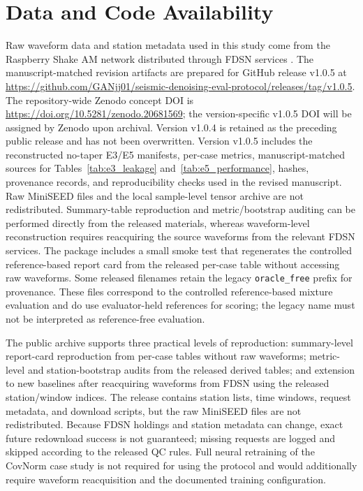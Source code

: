 \documentclass[review,12pt,authoryear]{elsarticle}
\begin{document}
\section*{Data and Code Availability}
Raw waveform data and station metadata used in this study come from the Raspberry Shake AM network distributed through FDSN services \citep{raspberryshake2016}. The manuscript-matched revision artifacts are prepared for GitHub release v1.0.5 at \url{https://github.com/GANjj01/seismic-denoising-eval-protocol/releases/tag/v1.0.5}. The repository-wide Zenodo concept DOI is \url{https://doi.org/10.5281/zenodo.20681569}; the version-specific v1.0.5 DOI will be assigned by Zenodo upon archival. Version v1.0.4 is retained as the preceding public release and has not been overwritten. Version v1.0.5 includes the reconstructed no-taper E3/E5 manifests, per-case metrics, manuscript-matched sources for Tables~\ref{tab:e3_leakage} and~\ref{tab:e5_performance}, hashes, provenance records, and reproducibility checks used in the revised manuscript. Raw MiniSEED files and the local sample-level tensor archive are not redistributed. Summary-table reproduction and metric/bootstrap auditing can be performed directly from the released materials, whereas waveform-level reconstruction requires reacquiring the source waveforms from the relevant FDSN services. The package includes a small smoke test that regenerates the controlled reference-based report card from the released per-case table without accessing raw waveforms. Some released filenames retain the legacy \texttt{oracle\_free} prefix for provenance. These files correspond to the controlled reference-based mixture evaluation and do use evaluator-held references for scoring; the legacy name must not be interpreted as reference-free evaluation.

The public archive supports three practical levels of reproduction: summary-level report-card reproduction from per-case tables without raw waveforms; metric-level and station-bootstrap audits from the released derived tables; and extension to new baselines after reacquiring waveforms from FDSN using the released station/window indices. The release contains station lists, time windows, request metadata, and download scripts, but the raw MiniSEED files are not redistributed. Because FDSN holdings and station metadata can change, exact future redownload success is not guaranteed; missing requests are logged and skipped according to the released QC rules. Full neural retraining of the CovNorm case study is not required for using the protocol and would additionally require waveform reacquisition and the documented training configuration.
\end{document}
